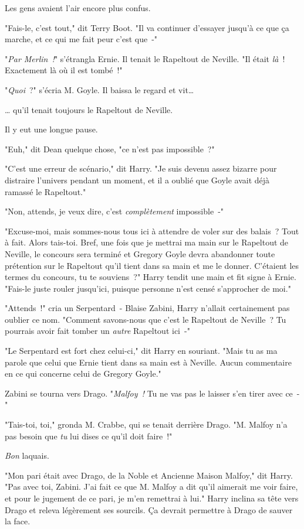 Les gens avaient l'air encore plus confus.

"Fais-le, c'est tout," dit Terry Boot. "Il va continuer d'essayer jusqu'à ce que ça marche, et ce qui me fait peur c'est que~-"

"\emph{Par Merlin~!}" s'étrangla Ernie. Il tenait le Rapeltout de Neville. "Il était \emph{là}~! Exactement là où il est tombé~!"

"\emph{Quoi}~?" s'écria M. Goyle. Il baissa le regard et vit…

… qu'il tenait toujours le Rapeltout de Neville.

Il y eut une longue pause.

"Euh," dit Dean quelque chose, "ce n'est pas impossible~?"

"C'est une erreur de scénario," dit Harry. "Je suis devenu assez bizarre pour distraire l'univers pendant un moment, et il a oublié que Goyle avait déjà ramassé le Rapeltout."

"Non, attends, je veux dire, c'est \emph{complètement} impossible~-"

"Excuse-moi, mais sommes-nous tous ici à attendre de voler sur des balais~? Tout à fait. Alors tais-toi. Bref, une fois que je mettrai ma main sur le Rapeltout de Neville, le concours sera terminé et Gregory Goyle devra abandonner toute prétention sur le Rapeltout qu'il tient dans sa main et me le donner. C'étaient les termes du concours, tu te souviens~?" Harry tendit une main et fit signe à Ernie. "Fais-le juste rouler jusqu'ici, puisque personne n'est censé s'approcher de moi."

"Attends~!" cria un Serpentard~- Blaise Zabini, Harry n'allait certainement pas oublier ce nom. "Comment savons-nous que c'est le Rapeltout de Neville~? Tu pourrais avoir fait tomber un \emph{autre} Rapeltout ici~-"

"Le Serpentard est fort chez celui-ci," dit Harry en souriant. "Mais tu as ma parole que celui que Ernie tient dans sa main est à Neville. Aucun commentaire en ce qui concerne celui de Gregory Goyle."

Zabini se tourna vers Drago. "\emph{Malfoy~!} Tu ne vas pas le laisser s'en tirer avec ce~-"

"Tais-toi, toi," gronda M. Crabbe, qui se tenait derrière Drago. "M. Malfoy n'a pas besoin que \emph{tu} lui dises ce qu'il doit faire~!"

\emph{Bon} laquais.

"Mon pari était avec Drago, de la Noble et Ancienne Maison Malfoy," dit Harry. "Pas avec toi, Zabini. J'ai fait ce que M. Malfoy a dit qu'il aimerait me voir faire, et pour le jugement de ce pari, je m'en remettrai à lui." Harry inclina sa tête vers Drago et releva légèrement ses sourcils. Ça devrait permettre à Drago de sauver la face.


